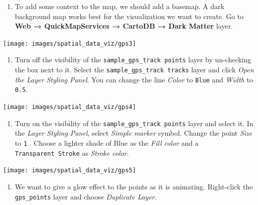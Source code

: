 \documentclass[
  12pt,
  a4paper]{article}
\providecommand{\tightlist}{%
  \setlength{\itemsep}{0pt}\setlength{\parskip}{0pt}}
\begin{document}
\begin{enumerate}
\def\labelenumi{\arabic{enumi}.}
\setcounter{enumi}{2}
\tightlist
\item
  To add some context to the map, we should add a basemap. A dark
  background map works best for the visualization we want to create. Go
  to \textbf{Web → QuickMapServices → CartoDB → Dark Matter} layer.
\end{enumerate}

\begin{center}\texttt{[image: images/spatial\_data\_viz/gps3]} \end{center}

\begin{enumerate}
\def\labelenumi{\arabic{enumi}.}
\setcounter{enumi}{3}
\tightlist
\item
  Turn off the visibility of the \texttt{sample\_gps\_track\ points}
  layer by un-checking the box next to it. Select the
  \texttt{sample\_gps\_track\ tracks} layer and click \emph{Open the
  Layer Styling Panel}. You can change the line \emph{Color} to
  \texttt{Blue} and \emph{Width} to \texttt{0.5}.
\end{enumerate}

\begin{center}\texttt{[image: images/spatial\_data\_viz/gps4]} \end{center}

\begin{enumerate}
\def\labelenumi{\arabic{enumi}.}
\setcounter{enumi}{4}
\tightlist
\item
  Turn on the visibility of the \texttt{sample\_gps\_track\ points}
  layer and select it. In the \emph{Layer Styling Panel}, select
  \emph{Simple marker} symbol. Change the point \emph{Size} to
  \texttt{1} . Choose a lighter shade of Blue as the \emph{Fill color}
  and a \texttt{Transparent\ Stroke} as \emph{Stroke color}.
\end{enumerate}

\begin{center}\texttt{[image: images/spatial\_data\_viz/gps5]} \end{center}

\begin{enumerate}
\def\labelenumi{\arabic{enumi}.}
\setcounter{enumi}{5}
\tightlist
\item
  We want to give a glow effect to the points as it is animating.
  Right-click the \texttt{gps\_points} layer and choose \emph{Duplicate
  Layer}.
\end{enumerate}
\end{document}
